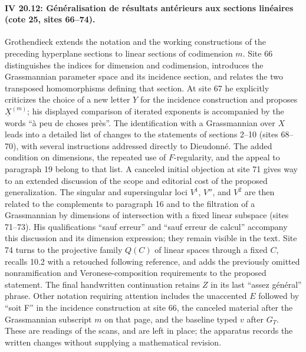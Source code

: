 \documentclass[10pt,a4paper]{article}
\begin{document}
\par{}
\par{}

\par{}
\paragraph{IV 20.12: Généralisation de résultats antérieurs aux sections linéaires (cote 25, sites 66--74).}
Grothendieck extends the notation and the working constructions of the preceding hyperplane sections to linear sections of codimension $m$. Site 66 distinguishes the indices for dimension and codimension, introduces the Grassmannian parameter space and its incidence section, and relates the two transposed homomorphisms defining that section. At site 67 he explicitly criticizes the choice of a new letter $Y$ for the incidence construction and proposes $\underline{X}^{(m)}$; his displayed comparison of iterated exponents is accompanied by the words ``à peu de choses près''. The identification with a Grassmannian over $X$ leads into a detailed list of changes to the statements of sections 2--10 (sites 68--70), with several instructions addressed directly to Dieudonné. The added condition on dimensions, the repeated use of $F$-regularity, and the appeal to paragraph 19 belong to that list. A canceled initial objection at site 71 gives way to an extended discussion of the scope and editorial cost of the proposed generalization. The singular and supersingular loci $V^1$, $V''$, and $V^2$ are then related to the complements to paragraph 16 and to the filtration of a Grassmannian by dimensions of intersection with a fixed linear subspace (sites 71--73). His qualifications ``sauf erreur'' and ``sauf erreur de calcul'' accompany this discussion and its dimension expression; they remain visible in the text. Site 74 turns to the projective family $Q(C)$ of linear spaces through a fixed $C$, recalls 10.2 with a retouched following reference, and adds the previously omitted nonramification and Veronese-composition requirements to the proposed statement. The final handwritten continuation retains $Z$ in its last ``assez général'' phrase. Other notation requiring attention includes the unaccented $E$ followed by ``soit F'' in the incidence construction at site 66, the canceled material after the Grassmannian subscript $m$ on that page, and the baseline typed $v$ after $G_T$. These are readings of the scans, and are left in place; the apparatus records the written changes without supplying a mathematical revision.
\par{}
\end{document}
